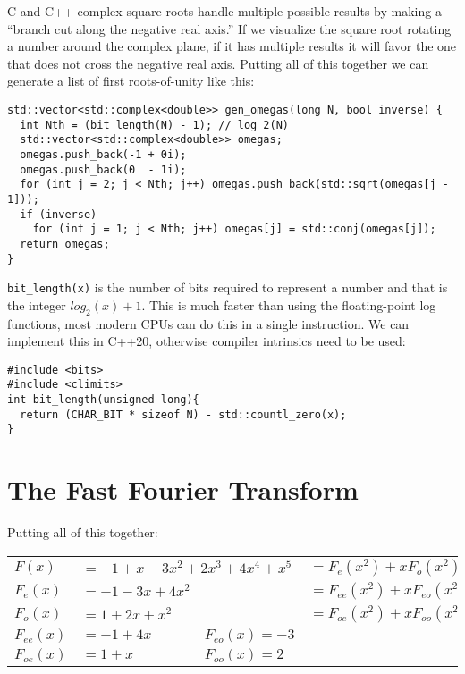 \documentclass[12pt]{article}
\begin{document}
C and C++ complex square roots handle multiple possible results by making a ``branch cut along the negative real axis.'' If we visualize the square root rotating a number around the complex plane, if it has multiple results it will favor the one that does not cross the negative real axis. Putting all of this together we can generate a list of first roots-of-unity like this:
\begin{lstlisting}
std::vector<std::complex<double>> gen_omegas(long N, bool inverse) {
  int Nth = (bit_length(N) - 1); // log_2(N)
  std::vector<std::complex<double>> omegas;
  omegas.push_back(-1 + 0i);
  omegas.push_back(0  - 1i);
  for (int j = 2; j < Nth; j++) omegas.push_back(std::sqrt(omegas[j - 1]));
  if (inverse)
    for (int j = 1; j < Nth; j++) omegas[j] = std::conj(omegas[j]);
  return omegas;
}
\end{lstlisting}

\texttt{bit\_length(x)} is the number of bits required to represent a number and that is the integer $log_2(x) + 1$. This is much faster than using the floating-point log functions, most modern CPUs can do this in a single instruction. We can implement this in C++20, otherwise compiler intrinsics need to be used:
\begin{lstlisting}
#include <bits>
#include <climits>
int bit_length(unsigned long){
  return (CHAR_BIT * sizeof N) - std::countl_zero(x);
}
\end{lstlisting}

\pagebreak

\section{The Fast Fourier Transform}
Putting all of this together:
\begin{center}
  \begin{tabular}{llll}
    $F(x)$      & \multicolumn{2}{l}{$= -1+x-3x^2+2x^3+4x^4+x^5$} & $=F_e(x^2)+xF_o(x^2)$                                \\
    $F_e(x)$    & $=-1-3x+4x^2$                                   &                       & $=F_{ee}(x^2)+xF_{eo}(x^2)$  \\
    $F_o(x)$    & $=1+2x+x^2$                                     &                       & $= F_{oe}(x^2)+xF_{oo}(x^2)$ \\
    $F_{ee}(x)$ & $=-1+4x$                                        & $F_{eo}(x)=-3$        &                              \\
    $F_{oe}(x)$ & $=1+x$                                          & $F_{oo}(x)=2$         &                              \\
  \end{tabular}
\end{center}
\end{document}
